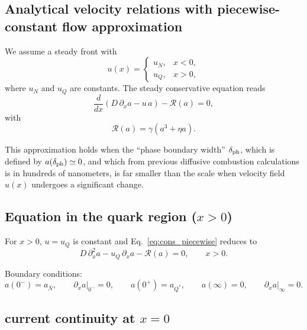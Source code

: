 \documentclass[11pt]{article}
\begin{document}
\subsection{Analytical velocity relations with piecewise-constant flow approximation}

We assume a steady front with
\begin{equation}
u(x)=
\begin{cases}
u_N, & x<0,\\
u_Q, & x>0,
\end{cases}
\end{equation}
where $u_N$ and $u_Q$ are constants. The steady conservative equation reads
\begin{equation}
\frac{d}{dx}\!\left(D\,\partial_x a - u\,a\right) - \mathcal R(a)=0,
\label{eq:cons_piecewise}
\end{equation}
with
\begin{equation}
\mathcal R(a)=\gamma\left(a^3+\eta a\right).
\label{eq:R_cubic}
\end{equation}

This approximation holds when the ``phase boundary width'' $\delta_{\rm ph}$, which is defined by $a(\delta_{\rm ph})\simeq 0$, and which from previous diffusive combustion calculations is in hundreds of nanometers, is far smaller than the scale when velocity field $u(x)$ undergoes a significant change. 

\subsection{Equation in the quark region ($x>0$)}

For $x>0$, $u=u_Q$ is constant and Eq.~\eqref{eq:cons_piecewise} reduces to
\begin{equation}
D\,\partial_x^2 a - u_Q\,\partial_x a - \mathcal R(a)=0,
\qquad x>0.
\label{eq:ode_quark}
\end{equation}

Boundary conditions:
\begin{equation}
a(0^-) = a_{\bar N},
\qquad 
\left.\partial_x a\right|_{0^-} = 0,
\qquad 
a(0^+)=a_{Q^*},
\qquad
a(\infty)=0,
\qquad
\left.\partial_x a\right|_{\infty}=0.
\end{equation}

\subsection{current continuity at $x=0$}
\end{document}
